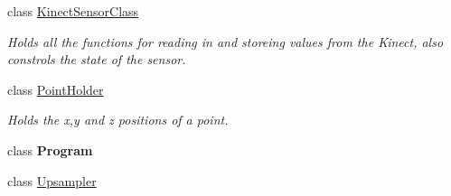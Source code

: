 \begin{DoxyCompactItemize}
class \hyperlink{classkinect_expirement_1_1_kinect_sensor_class}{Kinect\+Sensor\+Class}
\begin{DoxyCompactList}\small\item\em Holds all the functions for reading in and storeing values from the Kinect, also constrols the state of the sensor. \end{DoxyCompactList}\item 
class \hyperlink{classkinect_expirement_1_1_point_holder}{Point\+Holder}
\begin{DoxyCompactList}\small\item\em Holds the x,y and z positions of a point. \end{DoxyCompactList}\item 
class {\bfseries Program}
\item 
class \hyperlink{classkinect_expirement_1_1_upsampler}{Upsampler}
\end{DoxyCompactItemize}
